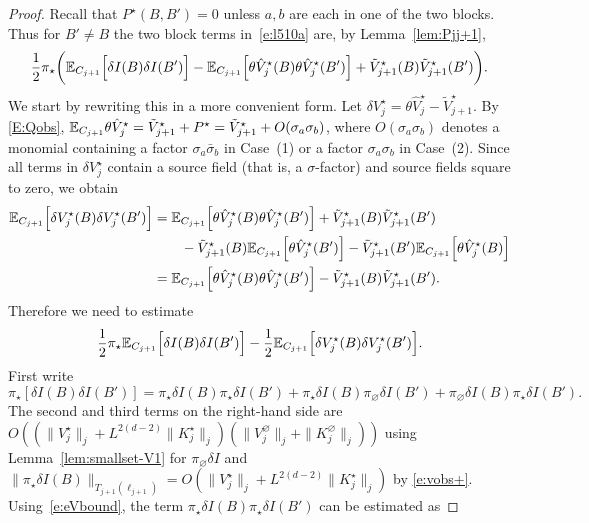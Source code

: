 \documentclass[11pt]{amsart}
\numberwithin{equation}{section}
\numberwithin{theorem}{section}
\newcommand{\1}{{\bf 1}}
\newcommand{\obs}{\star}
\newcommand{\Vbulk}{V^\varnothing}
\newcommand{\Vobs}{V^\obs}
\newcommand{\Kbulk}{K^\varnothing}
\newcommand{\Kobs}{K^\obs}
\newcommand{\tVobs}{\tilde{V}^{\obs}}
\newcommand{\hVobs}{\hat V^\obs}
\begin{document}
\begin{proof}
  Recall that $P^\obs(B,B')=0$ unless $a, b$ are each in one
  of the two blocks. Thus for $B' \neq B$ the two block terms
  in~\eqref{e:l510a}  are,  by Lemma~\ref{lem:Pjj+1},
  \begin{equation}
    \frac12 \pi_\obs \pbb{\E_{C_{j+1}} \qB{\delta I(B)\delta I(B')}
      -  \E_{C_{j+1}}\qB{\theta \hVobs_j(B)\theta \hVobs_j(B')} + \tVobs_{j+1}(B)  \tVobs_{j+1}(B')}
      .
  \end{equation}
  We start by rewriting this in a more convenient form.
  Let $\delta V_j^{\obs} = \theta \hat V_j^{\obs}-\tilde V_{j+1}^{\obs}$. 
By \eqref{E:Qobs},
$\E_{C_{j+1}}\theta \hat V^\obs_j  
= \tVobs_{j+1} + P^\obs = \tVobs_{j+1} + 
 O(\sigma_a\sigma_b)$,
 where $O(\sigma_a\sigma_b)$ denotes a 
 monomial containing a factor $\sigma_a\bar\sigma_b$ in Case~(1) or a factor $\sigma_a\sigma_b$ in Case~(2).
 Since all terms in $\delta \Vobs_j$ contain a source field (that is, a
 $\sigma$-factor) and source fields square to zero, we obtain
  \begin{align}
    \E_{C_{j+1}}\qB{\delta \Vobs_j(B)\delta \Vobs_j(B')}
    &=
      \E_{C_{j+1}}\qB{\theta \hVobs_j(B)\theta\hVobs_j(B')}
      + \tVobs_{j+1}(B)\tVobs_{j+1}(B')
      \nnb
      &\qquad
        -\tVobs_{j+1}(B) \E_{C_{j+1}}\qB{\theta \hVobs_j(B')} -\tVobs_{j+1}(B') \E_{C_{j+1}}\qB{\theta \hVobs_j(B)} \nnb
          &=
            \E_{C_{j+1}}\qB{\theta \hVobs_j(B)\theta\hVobs_j(B')} - \tVobs_{j+1}(B)\tVobs_{j+1}(B')
            .
  \end{align}
  Therefore we need to estimate
    \begin{equation}
    \frac12 \pi_\obs \E_{C_{j+1}} \qB{\delta I(B)\delta I(B')}
    -      \frac12  \E_{C_{j+1}}\qB{\delta \Vobs_j(B)\delta \Vobs_j(B')}
      .
  \end{equation}
  First write
  \begin{equation}
    \pi_\obs[ \delta I(B)\delta I(B')]
    =
    \pi_\obs \delta I(B)\pi_\obs \delta I(B')
    +
    \pi_\obs \delta I(B)\pi_\varnothing \delta I(B')
    +
    \pi_\varnothing \delta I(B)\pi_\obs \delta I(B') .
  \end{equation}
  The second and third terms on the right-hand side are $O((\|\Vobs_{j}\|_{j}+L^{2(d-2)}\|\Kobs_{j}\|_{j})(\|\Vbulk_j\|_j+\|\Kbulk_j\|_j))$
  using Lemma~\ref{lem:smallset-V1}
  for $\pi_\varnothing \delta I$ and $\|\pi_{\obs}\delta I(B)\|_{T_{j+1}(\ell_{j+1})}
  =O(\|\Vobs_{j}\|_{j}+L^{2(d-2)}\|\Kobs_{j}\|_{j})$ by \eqref{e:vobs+}.
  Using~\eqref{e:eVbound}, the term $\pi_\obs \delta I(B)\pi_\obs \delta I(B')$ can be estimated as

\end{proof}
\end{document}
